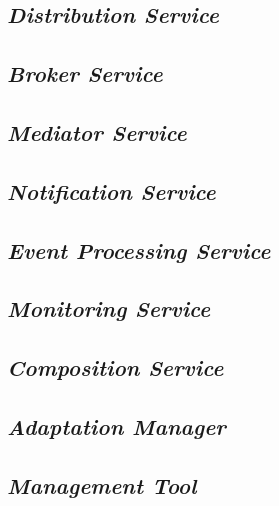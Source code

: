 \subsection{\textit{Distribution Service}}

\subsection{\textit{Broker Service}}

\subsection{\textit{Mediator Service}}

\subsection{\textit{Notification Service}}

\subsection{\textit{Event Processing Service}}
\label{subsec:cep}

\subsection{\textit{Monitoring Service}}
\label{subsec:monit_serv}

\subsection{\textit{Composition Service}}

\subsection{\textit{Adaptation Manager}}

\subsection{\textit{Management Tool}}

